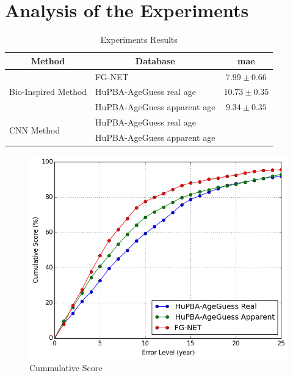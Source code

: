 \section{Analysis of the Experiments}

\begin{table}[!h]
	\centering
	\begin{tabular}{|l|l|c|}
		\hline
		\multicolumn{1}{|c|}{\textbf{Method}} & 
		\multicolumn{1}{|c|}{\textbf{Database}} & \textbf{\gls{mae}}\\ \hline\hline%
		\multirow{3}{*}{Bio-Inspired Method} & FG-NET & $7.99 \pm 0.66$\\ 		\cline{2-3} 
				& HuPBA-AgeGuess real age & $10.73 \pm 0.35$\\ \cline{2-3}
				& HuPBA-AgeGuess apparent age & $9.34 \pm 0.35$\\ \hline\hline%
		\multirow{2}{*}{CNN Method} & HuPBA-AgeGuess real age & \\ \cline{2-3}
				& HuPBA-AgeGuess apparent age & \\ \hline
		
		
	\end{tabular}
	\caption{Experiments Results}
	\label{tab:results}
\end{table}
\begin{figure}[!h]
	\centering
	\includegraphics[width=\textwidth]{figures/cum_score}
	\caption{Cummulative Score }
	\label{fig:cumS}
\end{figure}
